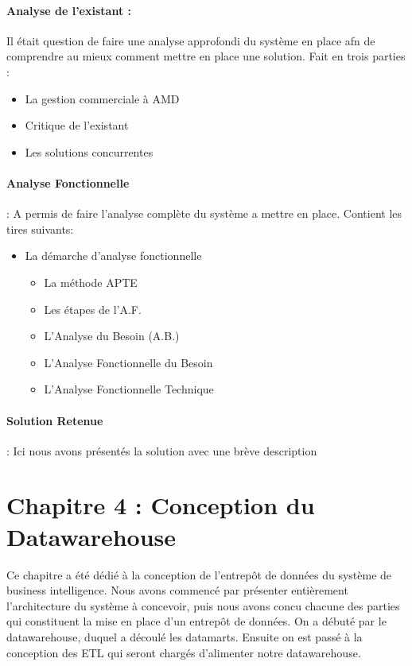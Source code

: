 \paragraph{Analyse de l’existant :} Il était question de faire une analyse approfondi du système en place afn de comprendre au mieux comment mettre en place une solution. Fait en trois parties :
\begin{itemize}
    \item La gestion commerciale à AMD
    \item Critique de l’existant
    \item Les solutions concurrentes
\end{itemize}

\paragraph{Analyse Fonctionnelle }: A permis de faire l'analyse complète du système a mettre en place. Contient les tires suivants: 
\begin{itemize}
    \item La démarche d’analyse fonctionnelle
    \begin{itemize}
        \item La méthode APTE
        \item Les étapes de l’A.F.
        \item L'Analyse du Besoin (A.B.)
        \item L'Analyse Fonctionnelle du Besoin
        \item L'Analyse Fonctionnelle Technique
    \end{itemize}
\end{itemize}

\paragraph{Solution Retenue} : Ici nous avons présentés la solution avec une brève description

\section*{Chapitre 4 : Conception du Datawarehouse}
Ce chapitre a été dédié à la conception de l’entrepôt de données du système de business intelligence. Nous avons commencé par présenter entièrement l’architecture du système à concevoir, puis nous avons concu chacune des parties qui constituent la mise en place d’un entrepôt de données. On a débuté par le datawarehouse, duquel a découlé les datamarts. Ensuite on est passé à la conception des ETL qui seront chargés d’alimenter notre datawarehouse.

